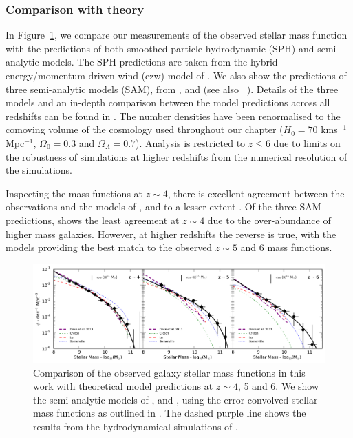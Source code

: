 \subsubsection{Comparison with theory}\label{smf-sec:theory}
In Figure~\ref{smf-fig:smf_theory}, we compare our measurements of the observed stellar mass function with the predictions of both smoothed particle hydrodynamic (SPH) and semi-analytic models. The SPH predictions are taken from the hybrid energy/momentum-driven wind (ezw) model of \citet{Dave:2013bf}. We also show the predictions of three semi-analytic models (SAM), from \citet{Croton:2006ew}, \citet{Lu:2011hj} and \citet{Somerville:2008ed} (see also \citeauthor{Somerville:2012cq}~\citeyear{Somerville:2012cq}). Details of the three models and an in-depth comparison between the model predictions across all redshifts can be found in \citet{Lu:2014kl}. The number densities have been renormalised to the comoving volume of the cosmology used throughout our chapter ($H_{0} = 70$ kms$^{-1}$Mpc$^{-1}$, $\Omega_{0}=0.3$ and $\Omega_{\Lambda}=0.7$). Analysis is restricted to $z \leq 6$ due to limits on the robustness of simulations at higher redshifts from the numerical resolution of the simulations.

Inspecting the mass functions at $z \sim 4$, there is excellent agreement between the observations and the models of \citet{Dave:2013bf}, \citet{Croton:2006ew} and to a lesser extent \citet{Lu:2011hj}. Of the three SAM predictions, \citet{Somerville:2008ed} shows the least agreement at $z\sim 4$ due to the over-abundance of higher mass galaxies. However, at higher redshifts the reverse is true, with the \citet{Somerville:2008ed} models providing the best match to the observed $z\sim5$ and 6 mass functions.

\begin{landscape}
\begin{figure}
\centering
\includegraphics[width=0.8\paperheight	]{plots/fig11.pdf}
\caption[Comparison of the observed galaxy stellar mass functions in this work with theoretical model predictions at $z \sim 4$, 5 and 6.]{Comparison of the observed galaxy stellar mass functions in this work with theoretical model predictions at $z \sim 4$, 5 and 6. We show the semi-analytic models of \citet{Croton:2006ew}, \citet{Somerville:2008ed} and \citet{Lu:2011hj}, using the error convolved stellar mass functions as outlined in \citet{Lu:2014kl}. The dashed purple line shows the results from the hydrodynamical simulations of \citet{Dave:2013bf}.}
\label{smf-fig:smf_theory}
\end{figure}
\end{landscape}

